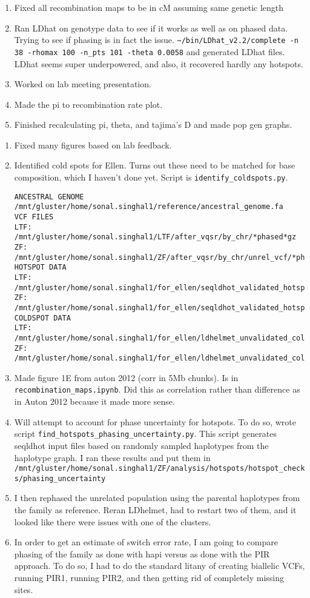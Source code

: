 \documentclass[idxtotoc,hyperref,openany,oneside]{labbook} %
\begin{document}
\begin{enumerate}
\item Fixed all recombination maps to be in cM assuming same genetic length
\item Ran LDhat on genotype data to see if it works as well as on phased data. Trying to see if phasing is in fact the issue. \verb+~/bin/LDhat_v2.2/complete -n 38 -rhomax 100 -n_pts 101 -theta 0.0058+ and generated LDhat files. LDhat seems super underpowered, and also, it recovered hardly any hotspots.
\item Worked on lab meeting presentation.
\item Made the pi to recombination rate plot.
\item Finished recalculating pi, theta, and tajima's D and made pop gen graphs.
\end{enumerate}

\begin{enumerate}
\item Fixed many figures based on lab feedback.
\item Identified cold spots for Ellen. Turns out these need to be matched for base composition, which I haven't done yet. Script is \verb+identify_coldspots.py+.
\begin{verbatim}
ANCESTRAL GENOME
/mnt/gluster/home/sonal.singhal1/reference/ancestral_genome.fa
VCF FILES
LTF: /mnt/gluster/home/sonal.singhal1/LTF/after_vqsr/by_chr/*phased*gz
ZF: /mnt/gluster/home/sonal.singhal1/ZF/after_vqsr/by_chr/unrel_vcf/*phased*gz
HOTSPOT DATA
LTF: /mnt/gluster/home/sonal.singhal1/for_ellen/seqldhot_validated_hotspots.LTF.csv
ZF: /mnt/gluster/home/sonal.singhal1/for_ellen/seqldhot_validated_hotspots.ZF.csv
COLDSPOT DATA
LTF: /mnt/gluster/home/sonal.singhal1/for_ellen/ldhelmet_unvalidated_coldspots.LTF.csv
ZF: /mnt/gluster/home/sonal.singhal1/for_ellen/ldhelmet_unvalidated_coldspots.ZF.csv
\end{verbatim}
\item Made figure 1E from auton 2012 (corr in 5Mb chunks). Is in \verb+recombination_maps.ipynb+. Did this as correlation rather than difference as in Auton 2012 because it made more sense.
\item Will attempt to account for phase uncertainty for hotspots. To do so, wrote script \verb+find_hotspots_phasing_uncertainty.py+. This script generates seqldhot input files based on randomly sampled haplotypes from the haplotype graph. I ran these results and put them in \verb+/mnt/gluster/home/sonal.singhal1/ZF/analysis/hotspots/hotspot_checks/phasing_uncertainty+
\item I then rephased the unrelated population using the parental haplotypes from the family as reference. Reran LDhelmet, had to restart two of them, and it looked like there were issues with one of the clusters.
\item In order to get an estimate of switch error rate, I am going to compare phasing of the family as done with hapi versus as done with the PIR approach. To do so, I had to do the standard litany of creating biallelic VCFs, running PIR1, running PIR2, and then getting rid of completely missing sites.
\end{enumerate}
\end{document}

